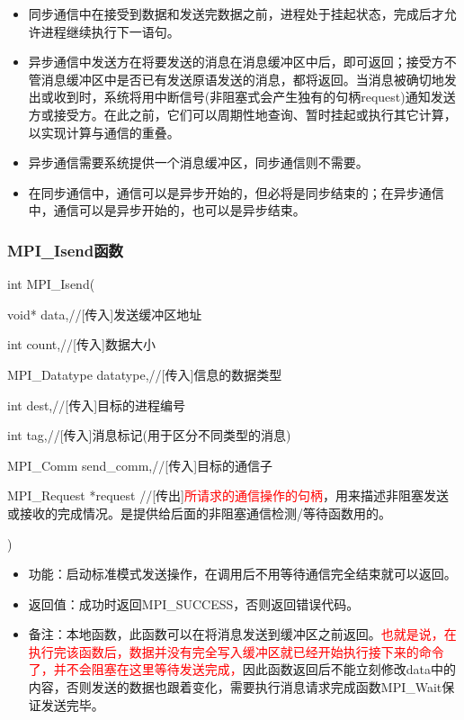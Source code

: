 \documentclass[UTF8]{article}%
\begin{document}
\begin{itemize}
    \item 同步通信中在接受到数据和发送完数据之前，进程处于挂起状态，完成后才允许进程继续执行下一语句。
    \item 异步通信中发送方在将要发送的消息在消息缓冲区中后，即可返回；接受方不管消息缓冲区中是否已有发送原语发送的消息，都将返回。当消息被确切地发出或收到时，系统将用中断信号(非阻塞式会产生独有的句柄request)通知发送方或接受方。在此之前，它们可以周期性地查询、暂时挂起或执行其它计算，以实现计算与通信的重叠。
    \item 异步通信需要系统提供一个消息缓冲区，同步通信则不需要。
    \item 在同步通信中，通信可以是异步开始的，但必将是同步结束的；在异步通信中，通信可以是异步开始的，也可以是异步结束。
\end{itemize}

\subsubsection{MPI\_Isend函数}

int MPI\_Isend(

    \qquad void*                data,//[传入]发送缓冲区地址

    \qquad int                  count,//[传入]数据大小

    \qquad MPI\_Datatype        datatype,//[传入]信息的数据类型

    \qquad int                  dest,//[传入]目标的进程编号

    \qquad int                  tag,//[传入]消息标记(用于区分不同类型的消息)

    \qquad MPI\_Comm            send\_comm,//[传入]目标的通信子

    \qquad MPI\_Request         *request //[传出]\textcolor{red}{所请求的通信操作的句柄}，用来描述非阻塞发送或接收的完成情况。是提供给后面的非阻塞通信检测/等待函数用的。
    
    )

\begin{itemize}
    \item 功能：启动标准模式发送操作，在调用后不用等待通信完全结束就可以返回。
    \item 返回值：成功时返回MPI\_SUCCESS，否则返回错误代码。
    \item 备注：本地函数，此函数可以在将消息发送到缓冲区之前返回。\textcolor{red}{也就是说，在执行完该函数后，数据并没有完全写入缓冲区就已经开始执行接下来的命令了，并不会阻塞在这里等待发送完成，}因此函数返回后不能立刻修改data中的内容，否则发送的数据也跟着变化，需要执行消息请求完成函数MPI\_Wait保证发送完毕。
\end{itemize}
\end{document}
